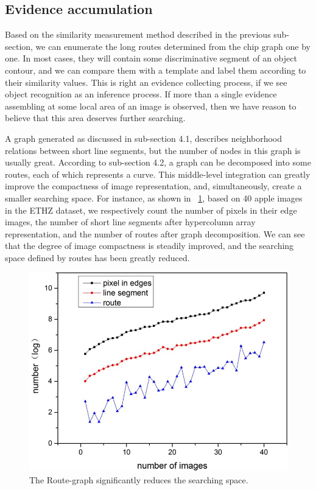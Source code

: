 \documentclass[journal]{IEEEtran}
\begin{document}
\subsection{Evidence accumulation}

Based on the similarity measurement method described in the previous sub-section, 
we can enumerate the long routes determined from the chip graph one by one. 
In most cases, they will contain some discriminative segment of an object contour, 
and we can compare them with a template and label them according to their similarity values. 
This is right an evidence collecting process, 
if we see object recognition as an inference process. 
If more than a single evidence assembling at some local area of an image is observed, 
then we have reason to believe that this area deserves further searching.

A graph generated as discussed in sub-section 4.1, 
describes neighborhood relations between short line segments, 
but the number of nodes in this graph is usually great. 
According to sub-section 4.2, a graph can be decomposed into some routes, each of which represents a curve. 
This middle-level integration can greatly improve the compactness of image representation, 
and, simultaneously, create a smaller searching space. 
For instance, as shown in \figurename~\ref{fig:14}, based on 40 apple images in the ETHZ dataset, 
we respectively count the number of pixels in their edge images, the number of short line segments after hypercolumn array representation, and the number of routes after graph decomposition. 
We can see that the degree of image compactness is steadily improved, and the searching space defined by routes has been greatly reduced.

\begin{figure}[!t]
\centering
\includegraphics[width=0.7\linewidth]{images/fig14.jpg}
\caption{The Route-graph significantly reduces the searching space.}
\label{fig:14}
\end{figure}
\end{document}

